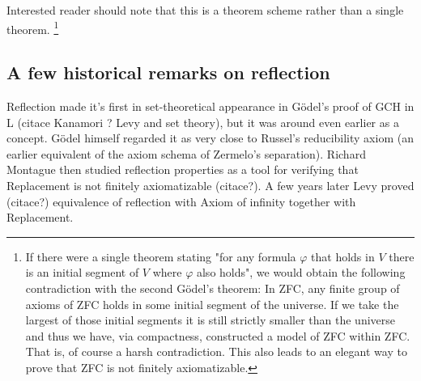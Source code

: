 \documentclass[12pt,a4paper]{article}
\begin{document}
\medskip 

Interested reader should note that this is a theorem scheme rather than a single theorem. \footnote{If there were a single theorem stating "for any formula $\varphi$ that holds in $V$ there is an initial segment of $V$ where $\varphi$ also holds", we would obtain the following contradiction with the second G{\"o}del's theorem: In ZFC, any finite group of axioms of ZFC holds in some initial segment of the universe. If we take the largest of those initial segments it is still strictly smaller than the universe and thus we have, via compactness, constructed a model of ZFC within ZFC. That is, of course a harsh contradiction. This also leads to an elegant way to prove that ZFC is not finitely axiomatizable.}

\medskip

\subsection{A few historical remarks on reflection}\label{sec:History}  %
 
 
Reflection made it's first in set-theoretical appearance in G{\"o}del's proof of GCH in L  (citace Kanamori ? Levy and set theory), but it was around even earlier as a concept. G{\"o}del himself regarded it as very close to Russel's reducibility axiom (an earlier equivalent of the axiom schema of Zermelo's separation). Richard Montague then studied reflection properties as a tool for verifying that Replacement is not finitely axiomatizable (citace?). A few years later Levy proved (citace?) equivalence of reflection with Axiom of infinity together with Replacement.
\end{document}
